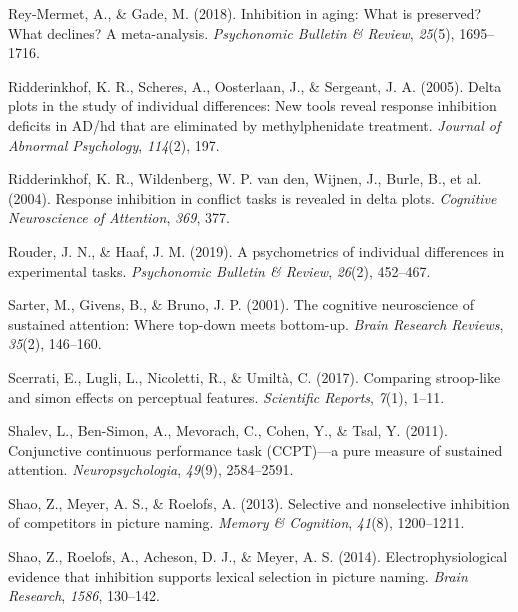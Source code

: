\documentclass[
  man,floatsintext]{apa6}
\newlength{\cslhangindent}
\newlength{\cslentryspacingunit} %
\newenvironment{CSLReferences}[2] %
 {%
  \setlength{\parindent}{0pt}
  \ifodd #1
  \let\oldpar\par
  \def\par{\hangindent=\cslhangindent\oldpar}
  \fi
  \setlength{\parskip}{#2\cslentryspacingunit}
 }%
 {}
\begin{document}
\begin{CSLReferences}{1}{0}
\leavevmode{}%
Rey-Mermet, A., \& Gade, M. (2018). Inhibition in aging: What is preserved? What declines? A meta-analysis. \emph{Psychonomic Bulletin \& Review}, \emph{25}(5), 1695--1716.

\leavevmode{}%
Ridderinkhof, K. R., Scheres, A., Oosterlaan, J., \& Sergeant, J. A. (2005). Delta plots in the study of individual differences: New tools reveal response inhibition deficits in AD/hd that are eliminated by methylphenidate treatment. \emph{Journal of Abnormal Psychology}, \emph{114}(2), 197.

\leavevmode{}%
Ridderinkhof, K. R., Wildenberg, W. P. van den, Wijnen, J., Burle, B., et al. (2004). Response inhibition in conflict tasks is revealed in delta plots. \emph{Cognitive Neuroscience of Attention}, \emph{369}, 377.

\leavevmode{}%
Rouder, J. N., \& Haaf, J. M. (2019). A psychometrics of individual differences in experimental tasks. \emph{Psychonomic Bulletin \& Review}, \emph{26}(2), 452--467.

\leavevmode{}%
Sarter, M., Givens, B., \& Bruno, J. P. (2001). The cognitive neuroscience of sustained attention: Where top-down meets bottom-up. \emph{Brain Research Reviews}, \emph{35}(2), 146--160.

\leavevmode{}%
Scerrati, E., Lugli, L., Nicoletti, R., \& Umiltà, C. (2017). Comparing stroop-like and simon effects on perceptual features. \emph{Scientific Reports}, \emph{7}(1), 1--11.

\leavevmode{}%
Shalev, L., Ben-Simon, A., Mevorach, C., Cohen, Y., \& Tsal, Y. (2011). Conjunctive continuous performance task (CCPT)---a pure measure of sustained attention. \emph{Neuropsychologia}, \emph{49}(9), 2584--2591.

\leavevmode{}%
Shao, Z., Meyer, A. S., \& Roelofs, A. (2013). Selective and nonselective inhibition of competitors in picture naming. \emph{Memory \& Cognition}, \emph{41}(8), 1200--1211.

\leavevmode{}%
Shao, Z., Roelofs, A., Acheson, D. J., \& Meyer, A. S. (2014). Electrophysiological evidence that inhibition supports lexical selection in picture naming. \emph{Brain Research}, \emph{1586}, 130--142.


\end{CSLReferences}
\end{document}
